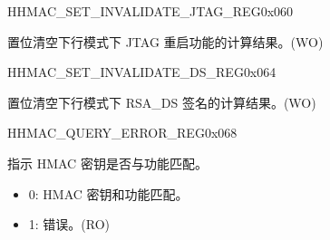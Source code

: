 \begin{register}{H}{HMAC\_SET\_INVALIDATE\_JTAG\_REG}{0x{}060}\label{regdesc:HMACSETINVALIDATEJTAGREG}
%
%
\regnewline%
\begin{regdesc}\begin{reglist}
\label{fielddesc:HMACSETINVALIDATEJTAG}\item [HMAC\_SET\_INVALIDATE\_JTAG] 置位清空下行模式下 JTAG 重启功能的计算结果。(WO)
\end{reglist}\end{regdesc}
\end{register}


\begin{register}{H}{HMAC\_SET\_INVALIDATE\_DS\_REG}{0x{}064}\label{regdesc:HMACSETINVALIDATEDSREG}
%
%
\regnewline%
\begin{regdesc}\begin{reglist}
\label{fielddesc:HMACSETINVALIDATEDS}\item [HMAC\_SET\_INVALIDATE\_DS] 置位清空下行模式下 RSA\_DS 签名的计算结果。(WO)
\end{reglist}\end{regdesc}
\end{register}


\begin{register}{H}{HMAC\_QUERY\_ERROR\_REG}{0x{}068}\label{regdesc:HMACQUERYERRORREG}
%
%
\regnewline%
\begin{regdesc}\begin{reglist}
\label{fielddesc:HMACQUREYCHECK}\item [HMAC\_QUREY\_CHECK] 指示 HMAC 密钥是否与功能匹配。
\begin{itemize}
    \item 0: HMAC 密钥和功能匹配。
    \item 1: 错误。(RO)
\end{itemize}
\end{reglist}\end{regdesc}
\end{register}


